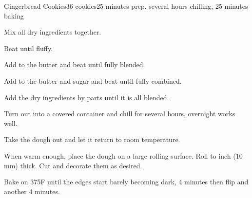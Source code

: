\documentclass[../Cookbook.tex]{subfiles}
\begin{document}
\begin{recipe}{Gingerbread Cookies}{36 cookies}{25 minutes prep, several hours chilling, 25 minutes baking}

	Mix all dry ingredients together.

	Beat until fluffy.

	Add to the butter and beat until fully blended.

	Add to the butter and sugar and beat until fully combined. 

	Add the dry ingredients by parts until it is all blended.

	Turn out into a covered container and chill for several hours, overnight works well.

	\newstep
	Take the dough out and let it return to room temperature.

	When warm enough, place the dough on a large rolling surface.
	Roll to  inch (10 mm) thick.
	Cut and decorate them as desired.

	\newstep
	Bake on 375\0F until the edges start barely becoming dark,
	4 minutes then flip and another 4 minutes.


\end{recipe}
\end{document}
